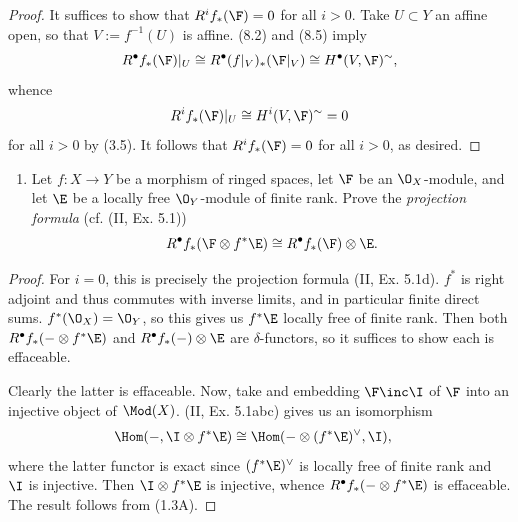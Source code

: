 \documentclass[12pt]{amsart}
\begin{document}
\begin{proof}
  It suffices to show that $R^if_*(\F)=0$ for all $i>0$.
  Take $U\subset Y$ an affine open, so that $V:=f^{-1}(U)$ is affine.
  (8.2) and (8.5) imply
  \[
    R^\bullet f_*(\F)|_U\cong R^\bullet(f|_V)_*(\F|_V)\cong  H^\bullet(V,\F)^\sim,
  \] 
  whence
  \[
    R^i f_*(\F)|_U\cong H^i(V,\F)^\sim = 0
  \] 
  for all $i>0$ by (3.5).
  It follows that $R^if_*(\F)=0$ for all $i>0$, as desired.
\end{proof}

\begin{enumerate}
  \item[8.3.] {
      Let $f:X\to Y$ be a morphism of ringed spaces, let $\F$ be an $\O_X$-module, and let $\E$ be a locally free $\O_Y$-module of finite rank.
      Prove the \emph{projection formula} (cf. (II, Ex. 5.1))
      \[
        R^\bullet f_*(\F\otimes f^*\E)\cong R^\bullet f_*(\F)\otimes \E.
      \] 
    }
\end{enumerate}

\begin{proof}
  For $i=0$, this is precisely the projection formula (II, Ex. 5.1d).
  $f^*$ is right adjoint and thus commutes with inverse limits, and in particular finite direct sums.
  $f^*(\O_X)=\O_Y$, so this gives us $f^*\E$ locally free of finite rank.
  Then both $R^\bullet f_*(-\otimes f^*\E)$ and $R^\bullet f_*(-)\otimes \E$ are $\delta$-functors, so it suffices to show each is effaceable.

  Clearly the latter is effaceable.
  Now, take and embedding $\F\inc \I$ of $\F$ into an injective object of $\Mod(X)$.
  (II, Ex. 5.1abc) gives us an isomorphism
  \begin{align*}
    \Hom(-, \I\otimes f^*\E)
      &\cong \Hom(-\otimes (f^*\E)^\vee, \I),
  \end{align*}
  where the latter functor is exact since $(f^*\E)^\vee$ is locally free of finite rank and $\I$ is injective.
  Then $\I\otimes f^*\E$ is injective, whence $R^\bullet f_*(-\otimes f^*\E)$ is effaceable.
  The result follows from (1.3A).
\end{proof}
\end{document}
